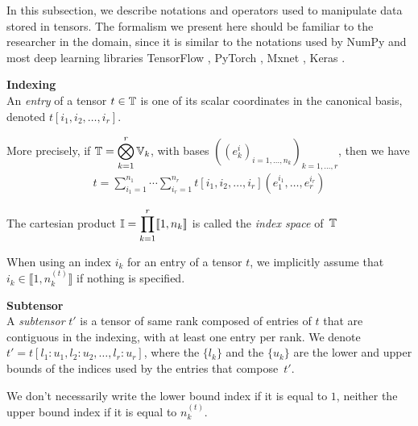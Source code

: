 In this subsection, we describe notations and operators used to manipulate data stored in tensors. The formalism we present here should be familiar to the researcher in the domain, since it is similar to the notations used by NumPy \citep{oliphant2006guide} and most deep learning libraries \eg TensorFlow \citep{tensorflow2015-whitepaper}, PyTorch \citep{paszke2017automatic}, Mxnet \citep{chen2015mxnet}, Keras \citep{chollet2015keras}.

\begin{definition}\textbf{Indexing}\\
An \emph{entry} of a tensor $t \in \mathbb{T}$ is one of its scalar coordinates in the canonical basis, denoted $t[i_1, i_2, \ldots, i_r]$.

More precisely, if $\mathbb{T} = \displaystyle \bigotimes_{k=1}^r \mathbb{V}_k$, with bases $((e_k^i)_{i=1,\ldots,n_k})_{k=1,\ldots,r}$, then we have
\begin{gather*}
t =  \displaystyle \sum_{i_1=1}^{n_1} \cdots \sum_{i_r=1}^{n_r} t[i_1, i_2, \ldots, i_r] (e_1^{i_1}, \ldots, e_r^{i_r})
\end{gather*}

The cartesian product $\mathbb{I}=\displaystyle \prod_{k=1}^r \llbracket 1, n_k \rrbracket$ is called the \emph{index space} of~$\mathbb{T}$
\end{definition}

\begin{remark}
When using an index $i_k$ for an entry of a tensor $t$, we implicitly assume that $i_k \in \llbracket 1, n_k^{(t)} \rrbracket$ if nothing is specified.
\end{remark}

\begin{definition}\textbf{Subtensor}\\
A \emph{subtensor} $t'$ is a tensor of same rank composed of entries of $t$ that are contiguous in the indexing, with at least one entry per rank. We denote $t' = t[l_1{:}u_1, l_2{:}u_2, \ldots, l_r{:}u_r]$, where the $\{l_k\}$ and the $\{u_k\}$ are the lower and upper bounds of the indices used by the entries that compose~$t'$.
\end{definition}

\begin{remark}
We don't necessarily write the lower bound index if it is equal to $1$, neither the upper bound index if it is equal to $n_k^{(t)}$.
\end{remark}

